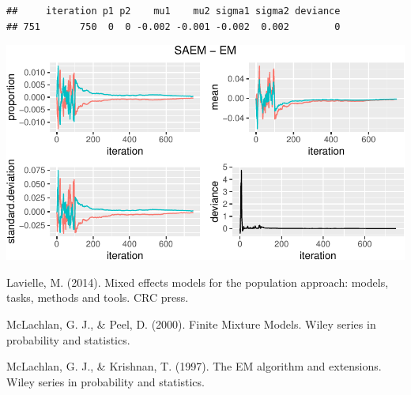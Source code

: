 \documentclass[
]{article}
\begin{document}
\begin{verbatim}
##     iteration p1 p2    mu1    mu2 sigma1 sigma2 deviance
## 751       750  0  0 -0.002 -0.001 -0.002  0.002        0
\end{verbatim}

\includegraphics{Reporte0108_files/figure-latex/unnamed-chunk-15-2.pdf}

\begin{thebibliography}{30}

 Lavielle, M. (2014). Mixed effects models for the population approach: models, tasks, methods and tools. CRC press.

 McLachlan, G. J., \& Peel, D. (2000). Finite Mixture Models. Wiley series in probability and statistics.

 McLachlan, G. J., \& Krishnan, T. (1997). The EM algorithm and extensions. Wiley series in probability and statistics.


\end{thebibliography}
\end{document}
